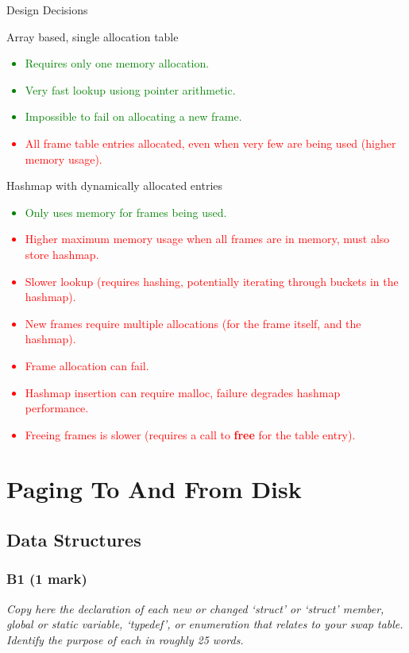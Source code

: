 \documentclass{report}
\newcommand{\question}[1]{\textit{#1} \ }
\newcommand{\fun}[1]{\textcolor{Emerald}{\textbf{#1}}}
\newcommand{\compitem}[1]{\begin{itemize}\setlength\itemsep{-0.5em}#1\end{itemize}}
\begin{document}
				Design Decisions
				\\ \begin{minipage}[t]{0.45\textwidth}
					\centerline{Array based, single allocation table}
					\textcolor{green}{

						
						\compitem{
							\item Requires only one memory allocation.
							\item Very fast lookup usiong pointer arithmetic.
							\item Impossible to fail on allocating a new frame.
						}
					}
					\textcolor{red}{
						\compitem{
							\item All frame table entries allocated, even when very few are being used (higher memory usage).
						}
					}
				\end{minipage}
				\hfill
				\begin{minipage}[t]{0.45\textwidth}
					\centerline{Hashmap with dynamically allocated entries}
					\textcolor{green}{
						\compitem{
							\item Only uses memory for frames being used.
						}
					}
					\textcolor{Red}{
						\compitem{
							\item Higher maximum memory usage when all frames are in memory, must also store hashmap.
							\item Slower lookup (requires hashing, potentially iterating through buckets in the hashmap).
							\item New frames require multiple allocations (for the frame itself, and the hashmap).
							\item Frame allocation can fail.
							\item Hashmap insertion can require malloc, failure degrades hashmap performance.
							\item Freeing frames is slower (requires a call to \fun{free} for the table entry).
						}
					}
				\end{minipage}
				
	\section*{Paging To And From Disk}
		\subsection*{Data Structures}
			\subsubsection*{B1 (1 mark)}
				\question{Copy here the declaration of each new or changed `struct' or
				`struct' member, global or static variable, `typedef', or enumeration 
				that relates to your swap table. Identify the purpose of each in roughly
				25 words.}
				
\end{document}

